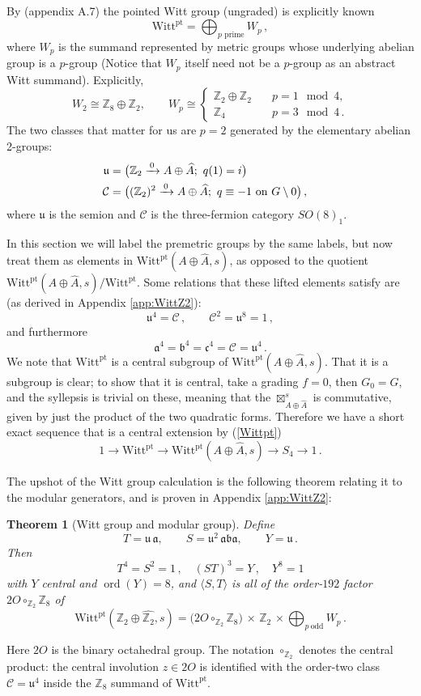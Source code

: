 \documentclass[aps,twocolumn,prx,floatfix,preprintnumbers, nofootinbib,10pt]{revtex4-2}
\numberwithin{equation}{section}
\newtheorem{theorem}{Theorem}[section]
\theoremstyle{definition}
\theoremstyle{remark}
\theoremstyle{claim}
\newcommand{\Perm}{S}
\newcommand{\be}{\begin{equation}}
\newcommand{\ee}{\end{equation}}
\newcommand{\ba}{\begin{aligned}}
\newcommand{\ea}{\end{aligned}}
\newcommand{\ord}{\operatorname{ord}}
\newcommand{\ga}{\mathfrak{a}}
\newcommand{\gb}{\mathfrak{b}}
\newcommand{\gc}{\mathfrak{c}}
\newcommand{\gu}{\mathfrak{u}}
\newcommand{\Z}{{\mathbb Z}}
\newcommand{\cC}{\mathcal{C}}
\newcommand{\Witt}{\text{Witt}}
\newcommand{\pt}{\text{pt}}
\begin{document}
By \cite{DGNO} (appendix A.7) the pointed Witt group (ungraded) is explicitly known 
\be\label{Wittpt}
\Witt^\pt = \bigoplus_{p \text{ prime}} W_p \,,
\ee
where $W_p$ is the summand represented by metric groups whose underlying
abelian group is a $p$-group (Notice that $W_p$ itself need not be a
$p$-group as an abstract Witt summand).
Explicitly,
\be\label{Wittp}
   W_2\cong\Z_8\oplus\Z_2,\qquad
  W_p \cong
  \begin{cases}
    \Z_2\oplus\Z_2 \quad & p =1 \mod 4,\\
    \Z_4\quad & p =3 \mod 4 \,.
  \end{cases}
\ee
The two classes that matter for us are $p=2$ generated by the
elementary abelian 2-groups:
\be \ba
  \gu &=\bigl(\Z_2\xrightarrow{\,0\,}{A \oplus \widehat{A}};\ q(1)=i\bigr)
 \cr 
  \cC&=\bigl((\Z_2)^2\xrightarrow{\,0\,}{A \oplus \widehat{A}};\ q\equiv-1\ \text{on}\ G\setminus 0\bigr) \,,
  \ea
\ee
where $\gu$ is the semion and $\cC$ is the three-fermion category $SO(8)_1$. 

{In this section we will label the premetric groups by the same labels, but now treat them as elements in $\Witt^\pt ({A \oplus \widehat{A}},s)$, as opposed to the quotient $\Witt^\pt ({A \oplus \widehat{A}},s)/\Witt^\pt$.  Some relations that these lifted elements satisfy are (as derived in Appendix \ref{app:WittZ2}):}
\be
\gu^4 = \cC \,,\qquad \cC^2 = \gu^8= 1  \,,
\ee
and furthermore 
\be
\ga^4=\gb^4=\gc^4=\cC=\gu^4  \,.
\ee
We note that $\Witt^\pt$ is a central subgroup of $\Witt^\pt (A \oplus \widehat{A}, s)$.
That it is a subgroup is clear; to show that it is central, take a grading $f=0$, then $G_0=G$, and the syllepsis is trivial on these, meaning that the $\boxtimes^s_{A \oplus \widehat{A}}$ is commutative, given by just the product of the two quadratic forms. 
Therefore we have a short exact sequence that is a central extension by (\ref{Wittpt})
\be
1 \to \Witt^\pt \to \Witt^\pt ({A \oplus \widehat{A}}, s) \to \Perm_4 \to 1 \,.
\ee

The upshot of the Witt group calculation is the following theorem relating it to the modular generators, and is proven in Appendix \ref{app:WittZ2}:
\begin{theorem}[Witt group and modular group]
\label{thm:modular}
Define
\be\label{ST}
  T=\gu\,\ga,\qquad S=\gu^{2}\,\ga\gb\ga,\qquad Y=\gu \,.
\ee
Then 
\be 
T^4=S^2=1\,,\quad (ST)^3=Y\,,\quad Y^8=1
\label{eq:STcat}
\ee
with $Y$ central and  $\ord(Y)=8$, and $\langle S,T\rangle$ is all of the order-$192$ factor
$2O\circ_{\Z_2}\Z_8$ of 
\be\label{fullsplit}
\Witt^\pt(\Z_2\oplus \widehat{\Z_2},s) = \big(2O\circ_{\Z_2}\Z_8\big)\,\times\,\Z_2\,\times\!\!\bigoplus_{p\ \mathrm{odd}} W_p \,.
\ee
\end{theorem}
Here $2O$ is the binary octahedral group.  The notation
$\circ_{\Z_2}$ denotes the central product: the central involution
$z\in 2O$ is identified with the order-two class $\cC=\gu^4$ inside the
$\Z_8$ summand of $\Witt^\pt$.
\end{document}
